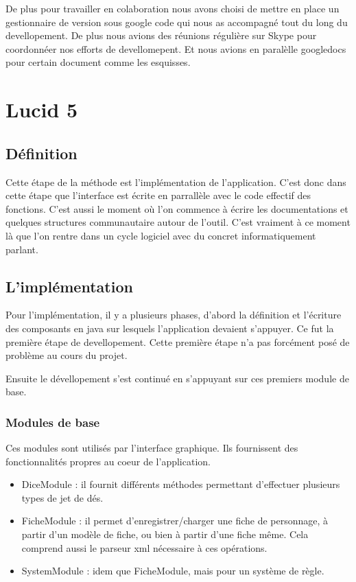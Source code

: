 \documentclass[11pt,a4paper]{article}
\begin{document}
De plus pour travailler en colaboration nous avons choisi de mettre en place un gestionnaire de version sous google code qui nous
as accompagné tout du long du devellopement. De plus nous avions des réunions régulière sur Skype pour coordonnéer nos efforts 
de devellomepent. Et nous avions en paralèlle googledocs pour certain document comme les esquisses.

\section{Lucid 5}

\subsection{Définition}

Cette étape de la méthode est l'implémentation de l'application. C'est donc dans
cette étape que l'interface est écrite en parrallèle avec le code effectif des
fonctions. C'est aussi le moment où l'on commence à écrire les documentations et
quelques structures communautaire autour de l'outil. C'est vraiment à ce moment
là que l'on rentre dans un cycle logiciel avec du concret informatiquement
parlant.

\subsection{L'implémentation}

Pour l'implémentation, il y a plusieurs phases, d'abord la définition et l'écriture des composants
en java sur lesquels l'application devaient s'appuyer. Ce fut la première étape de devellopement.
Cette première étape n'a pas forcément posé de problème au cours du projet.

Ensuite le dévellopement s'est continué en s'appuyant sur ces premiers module de base.


\subsubsection{Modules de base}

Ces modules sont utilisés par l'interface graphique. Ils fournissent des
fonctionnalités propres au coeur de l'application.

\begin{itemize}
  \item DiceModule : il fournit différents méthodes permettant d'effectuer
  plusieurs types de jet de dés.
  \item FicheModule : il permet d'enregistrer/charger une fiche de personnage, à
  partir d'un modèle de fiche, ou bien à partir d'une fiche même. Cela comprend
  aussi le parseur xml nécessaire à ces opérations.
  \item SystemModule : idem que FicheModule, mais pour un système de règle.
\end{itemize}
\end{document}
